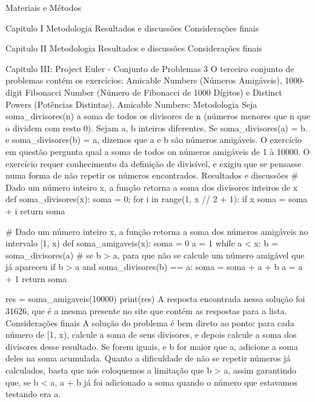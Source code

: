     Materiais e Métodos

Capitulo I
    Metodologia
    Resultados e discussões
    Considerações finais

Capitulo II
    Metodologia
    Resultados e discussões
    Considerações finais

Capitulo III: Project Euler - Conjunto de Problemas 3
    O terceiro conjunto de problemas contém os exercícios: Amicable Numbers (Números Amigáveis), 1000-digit Fibonacci Number (Número de Fibonacci de 1000 Dígitos) e Distinct Powers (Potências Distintas).
    Amicable Numbers:
        Metodologia
            Seja soma_divisores(n) a soma de todos os divisores de n (números menores que n que o dividem com resto 0). Sejam a, b inteiros diferentes. Se soma_divisores(a) = b. e soma_divisores(b) = a, dizemos que a e b são números amigáveis. O exercício em questão pergunta qual a soma de todos on números amigáveis de 1 à 10000.
            O exercício requer conhecimento da definição de divisível, e exigiu que se pensasse numa forma de não repetir os números encontrados.
        Resultados e discussões
            # Dado um número inteiro x, a função retorna a soma dos divisores inteiros de x
            def soma_divisores(x):
                soma = 0;
                for i in range(1, x // 2 + 1):
                    if x %
                        soma = soma + i
                return soma

            # Dado um número inteiro x, a função retorna a soma dos números amigáveis no intervalo [1, x)
            def soma_amigaveis(x):
                soma = 0
                a = 1
                while a < x:
                    b = soma_divisores(a)
                    # se b > a, para que não se calcule um número amigável que já apareceu
                    if b > a and soma_divisores(b) == a:
                        soma = soma + a + b
                    a = a + 1
                return soma

            res = soma_amigaveis(10000)
            print(res)
            A resposta encontrada nessa solução foi 31626, que é a mesma presente no site que contém as respostas para a lista.
        Considerações finais
            A solução do problema é bem direto ao ponto: para cada número de [1, x), calcule a soma de seus divisores, e depois calcule a soma dos divisores desse resultado. Se forem iguais, e b for maior que a, adicione a soma deles na soma acumulada.
            Quanto a dificuldade de não se repetir números já calculados, basta que nós coloquemos a limitação que b > a, assim garantindo que, se b < a, a + b já foi adicionado a soma quando o número que estavamos testando era a.

